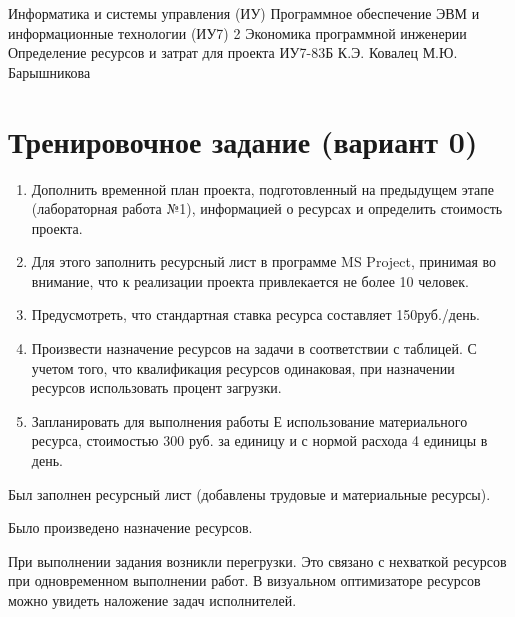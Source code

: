 \documentclass{bmstu}
\begin{document}
\makereporttitle
{Информатика и системы управления (ИУ)}
{Программное обеспечение ЭВМ и информационные технологии (ИУ7)}
{2}
{Экономика программной инженерии}
{Определение ресурсов и затрат для проекта}
{}
{ИУ7-83Б}
{К.Э. Ковалец}
{М.Ю. Барышникова}


\setcounter{page}{2}

\section*{Тренировочное задание (вариант 0)}

\begin{enumerate}
    \item Дополнить временной план проекта, подготовленный на предыдущем этапе (лабораторная работа №1), информацией о ресурсах и определить стоимость проекта.
    \item Для этого заполнить ресурсный лист в программе MS Project, принимая во внимание, что к реализации проекта привлекается не более 10 человек.
    \item Предусмотреть, что стандартная ставка ресурса составляет 150руб./день.
    \item Произвести назначение ресурсов на задачи в соответствии с таблицей. С учетом того, что квалификация ресурсов одинаковая, при назначении ресурсов использовать процент загрузки.
    

    \item Запланировать для выполнения работы Е использование материального ресурса, стоимостью 300 руб. за единицу и с нормой расхода 4 единицы в день.
\end{enumerate}

Был заполнен ресурсный лист (добавлены трудовые и материальные ресурсы).


\clearpage

Было произведено назначение ресурсов.




\clearpage

При выполнении задания возникли перегрузки.
Это связано с нехваткой ресурсов при одновременном выполнении работ.
В визуальном оптимизаторе ресурсов можно увидеть наложение задач исполнителей.
\end{document}
